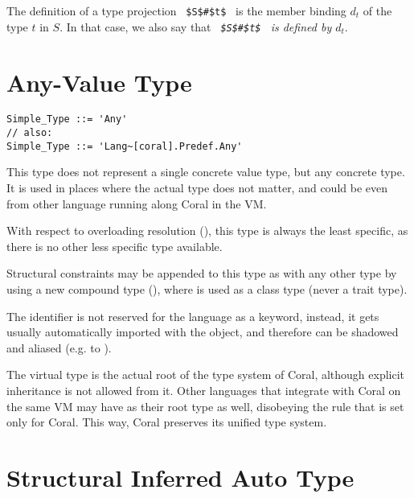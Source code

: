 \begin{enumerate}
The definition of a type projection ~\lstinline!$S$#$t$!~ is the member binding $d_t$ of the type $t$ in $S$. In that case, we also say that {\em ~\lstinline!$S$#$t$!~ is defined by $d_t$}. 

\end{enumerate}







\section{Any-Value Type}
\label{sec:any-value-type}

\syntax\begin{lstlisting}[morekeywords={Any}]
Simple_Type ::= 'Any'
// also:
Simple_Type ::= 'Lang~[coral].Predef.Any'
\end{lstlisting}

This type does not represent a single concrete value type, but any concrete type. It is used in places where the actual type does not matter, and could be even from other language running along Coral in the VM. 

With respect to overloading resolution (), this type is always the least specific, as there is no other less specific type available. 

Structural constraints may be appended to this type as with any other type by using a new compound type (), where  is used as a class type (never a trait type).

The  identifier is not reserved for the language as a keyword, instead, it gets usually automatically imported with the  object, and therefore can be shadowed and aliased (e.g. to ). 

The  virtual type is the actual root of the type system of Coral, although explicit inheritance is not allowed from it. Other languages that integrate with Coral on the same VM may have  as their root type as well, disobeying the rule that is set only for Coral. This way, Coral preserves its unified type system. 





\section{Structural Inferred Auto Type}
\label{sec:auto-type}

